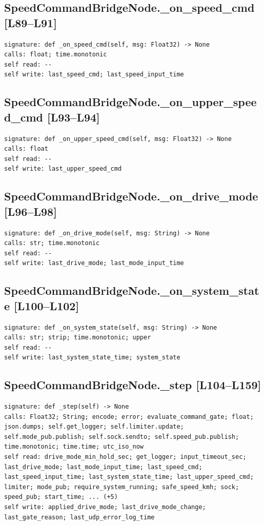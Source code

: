 \documentclass[a4paper,10pt,oneside]{book}
\begin{document}
\subsection*{SpeedCommandBridgeNode.\_on\_speed\_cmd [L89--L91]}
\begin{lstlisting}[numbers=none]
signature: def _on_speed_cmd(self, msg: Float32) -> None
calls: float; time.monotonic
self read: --
self write: last_speed_cmd; last_speed_input_time
\end{lstlisting}
\subsection*{SpeedCommandBridgeNode.\_on\_upper\_speed\_cmd [L93--L94]}
\begin{lstlisting}[numbers=none]
signature: def _on_upper_speed_cmd(self, msg: Float32) -> None
calls: float
self read: --
self write: last_upper_speed_cmd
\end{lstlisting}
\subsection*{SpeedCommandBridgeNode.\_on\_drive\_mode [L96--L98]}
\begin{lstlisting}[numbers=none]
signature: def _on_drive_mode(self, msg: String) -> None
calls: str; time.monotonic
self read: --
self write: last_drive_mode; last_mode_input_time
\end{lstlisting}
\subsection*{SpeedCommandBridgeNode.\_on\_system\_state [L100--L102]}
\begin{lstlisting}[numbers=none]
signature: def _on_system_state(self, msg: String) -> None
calls: str; strip; time.monotonic; upper
self read: --
self write: last_system_state_time; system_state
\end{lstlisting}
\subsection*{SpeedCommandBridgeNode.\_step [L104--L159]}
\begin{lstlisting}[numbers=none]
signature: def _step(self) -> None
calls: Float32; String; encode; error; evaluate_command_gate; float; json.dumps; self.get_logger; self.limiter.update; self.mode_pub.publish; self.sock.sendto; self.speed_pub.publish; time.monotonic; time.time; utc_iso_now
self read: drive_mode_min_hold_sec; get_logger; input_timeout_sec; last_drive_mode; last_mode_input_time; last_speed_cmd; last_speed_input_time; last_system_state_time; last_upper_speed_cmd; limiter; mode_pub; require_system_running; safe_speed_kmh; sock; speed_pub; start_time; ... (+5)
self write: applied_drive_mode; last_drive_mode_change; last_gate_reason; last_udp_error_log_time
\end{lstlisting}
\end{document}
